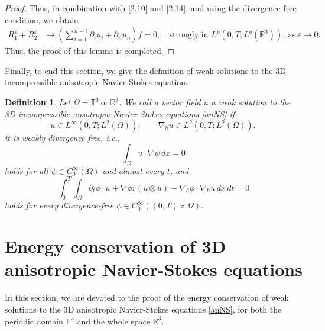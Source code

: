 \documentclass[11pt]{article}
\theoremstyle{plain}\newtheorem{definition}{Definition}[section]
\theoremstyle{definition}\newtheorem{theorem}{Theorem}[section]
\theoremstyle{plain}\newtheorem{lemma}[theorem]{Lemma}
\theoremstyle{plain}\newtheorem{coro}[theorem]{Corollary}
\theoremstyle{plain}\newtheorem{prop}[theorem]{Proposition}
\theoremstyle{remark}\newtheorem{remark}{Remark}[section]
\newcommand{\be}{\begin{equation}}
\newcommand{\ee}{\end{equation}}
\newcommand{\ba}{\begin{aligned}}
\newcommand{\ea}{\end{aligned}}
\numberwithin{equation}{section}
\begin{document}
\begin{proof}
Thus, in combination with \eqref{2.10} and \eqref{2.14}, and using the divergence-free condition, we obtain
\be\label{2.15}\ba
R_1^\varepsilon+R_2^\varepsilon &\to (\sum_{i=1}^{n-1} \partial_i u_i+\partial_n u_n) f=0, ~&\text{strongly~in~} L^{p}(0,T;L^{q}(\mathbb{R}^3)), ~\text{as} ~\varepsilon \to 0.
\ea\ee
Thus, the proof of this lemma is completed.
\end{proof}
Finally, to end this section, we give the definition of  weak solutions to the 3D incompressible anisotropic Navier-Stokes equations.
\begin{definition}\label{weak solution}
	Let $\Omega =\mathbb{T}^3~\text{or}~\mathbb{R}^3$. We call a vector field $u$ a weak solution to the 3D incompressible ansotropic Navier-Stokes equations \eqref{anNS} if
	\begin{equation}\label{2.17}
		u\in L^\infty(0,T;L^2(\Omega)),\qquad \nabla_h u\in L^2(0,T;L^2(\Omega)),
	\end{equation}
	it is weakly divergence-free, i.e.,
$$
	\int_{\Omega} u\cdot\nabla\psi\,dx = 0
$$
	holds for all $\psi\in C_0^\infty(\Omega)$ and almost every $t$, and
	\begin{equation}\label{2.18}
		\int_0^T\int_{\Omega}
		\partial_t\phi\cdot u
		+\nabla\phi:(u\otimes u)
		-\nabla_{h}\phi\cdot\nabla_{h}u
		\,dx\,dt = 0
	\end{equation}
	holds for every divergence-free $\phi\in C_0^\infty((0,T)\times\Omega)$.
\end{definition}


 \section{Energy conservation   of  3D anisotropic Navier-Stokes equations}
In this section, we are devoted to the proof of the energy conservation of weak solutions to the 3D anisotropic Navier-Stokes equations \eqref{anNS}, for both the periodic domain  $\mathbb{T}^3$ and the whole space $\mathbb{R}^3$.
\end{document}
